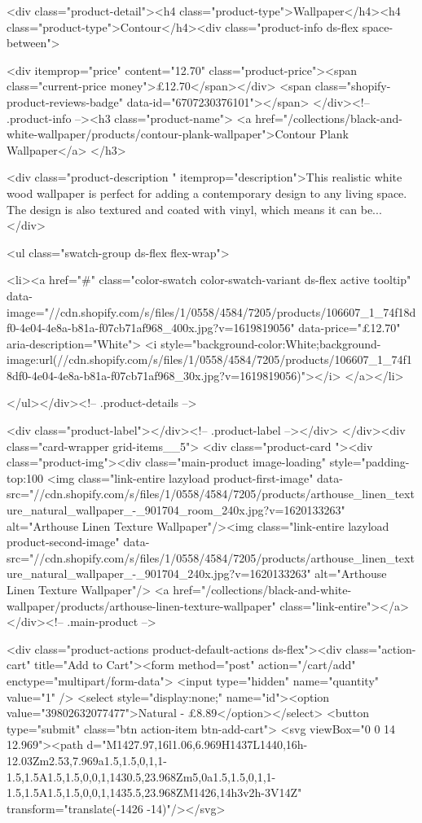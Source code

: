 {{{{{{{<div class="product-detail"><h4 class="product-type">Wallpaper</h4><h4 class="product-type">Contour</h4><div class="product-info ds-flex space-between">
    
<div itemprop="price" content="12.70" class="product-price"><span class="current-price money">£12.70</span></div>
    <span class="shopify-product-reviews-badge" data-id="6707230376101"></span>
  </div><!-- .product-info --><h3 class="product-name">
      <a href="/collections/black-and-white-wallpaper/products/contour-plank-wallpaper">Contour Plank Wallpaper</a>
    </h3>
    
<div class="product-description " itemprop="description">This realistic white wood wallpaper is perfect for adding a contemporary design to any living space. The design is also textured and coated with vinyl, which means it can be...
</div>



<ul class="swatch-group ds-flex flex-wrap">
        
<li><a href="#" class="color-swatch color-swatch-variant ds-flex active tooltip" data-image="//cdn.shopify.com/s/files/1/0558/4584/7205/products/106607_1_74f18df0-4e04-4e8a-b81a-f07cb71af968_400x.jpg?v=1619819056" data-price="£12.70" aria-description="White">
              <i style="background-color:White;background-image:url(//cdn.shopify.com/s/files/1/0558/4584/7205/products/106607_1_74f18df0-4e04-4e8a-b81a-f07cb71af968_30x.jpg?v=1619819056)"></i>
            </a></li>

      </ul></div><!-- .product-details -->

<div class="product-label"></div><!-- .product-label --></div>
          </div><div class="card-wrapper grid-items__5">
            <div class="product-card "><div class="product-img"><div class="main-product image-loading" style="padding-top:100%
      <img class="link-entire lazyload product-first-image" data-src="//cdn.shopify.com/s/files/1/0558/4584/7205/products/arthouse_linen_texture_natural_wallpaper_-_901704_room_240x.jpg?v=1620133263" alt="Arthouse Linen Texture Wallpaper"/><img class="link-entire lazyload product-second-image" data-src="//cdn.shopify.com/s/files/1/0558/4584/7205/products/arthouse_linen_texture_natural_wallpaper_-_901704_240x.jpg?v=1620133263" alt="Arthouse Linen Texture Wallpaper"/>
      <a href="/collections/black-and-white-wallpaper/products/arthouse-linen-texture-wallpaper" class="link-entire"></a>
    </div><!-- .main-product -->
  
<div class="product-actions product-default-actions ds-flex"><div class="action-cart" title="Add to Cart"><form method="post" action="/cart/add" enctype="multipart/form-data">
            <input type="hidden" name="quantity" value="1" />
            <select style="display:none;" name="id"><option value="39802632077477">Natural - £8.89</option></select>
            <button type="submit" class="btn action-item btn-add-cart">
              <svg viewBox="0 0 14 12.969"><path d="M1427.97,16l1.06,6.969H1437L1440,16h-12.03Zm2.53,7.969a1.5,1.5,0,1,1-1.5,1.5A1.5,1.5,0,0,1,1430.5,23.968Zm5,0a1.5,1.5,0,1,1-1.5,1.5A1.5,1.5,0,0,1,1435.5,23.968ZM1426,14h3v2h-3V14Z" transform="translate(-1426 -14)"/></svg>

}}}}}}}
